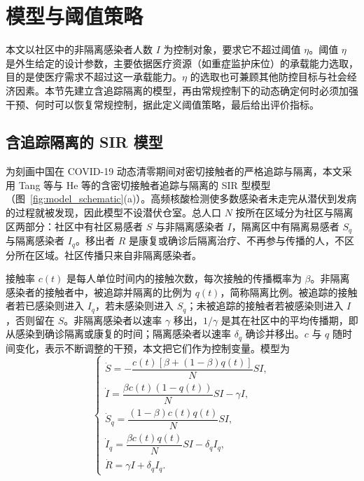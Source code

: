 \section{模型与阈值策略}
\label{sec:model}
本文以社区中的非隔离感染者人数 $I$ 为控制对象，要求它不超过阈值 $\eta$。阈值 $\eta$ 是外生给定的设计参数，主要依据医疗资源（如重症监护床位）的承载能力选取\cite{Miclo2022ICU,Angulo2021}，目的是使医疗需求不超过这一承载能力。$\eta$ 的选取也可兼顾其他防控目标与社会经济因素。本节先建立含追踪隔离的模型，再由常规控制下的动态确定何时必须加强干预、何时可以恢复常规控制，据此定义阈值策略，最后给出评价指标。

\subsection{含追踪隔离的 SIR 模型}
\label{sec:model:equations}
为刻画中国在 COVID-19 动态清零期间对密切接触者的严格追踪与隔离，本文采用 Tang 等\cite{Tang2023Threshold}与 He 等\cite{He2023TDINN}的含密切接触者追踪与隔离的 SIR 型模型（图~\ref{fig:model_schematic}(a)）。高频核酸检测使多数感染者未走完从潜伏到发病的过程就被发现，因此模型不设潜伏仓室。总人口 $N$ 按所在区域分为社区与隔离区两部分：社区中有社区易感者 $S$ 与非隔离感染者 $I$，隔离区中有隔离易感者 $S_q$ 与隔离感染者 $I_q$。移出者 $R$ 是康复或确诊后隔离治疗、不再参与传播的人，不区分所在区域。社区传播只来自非隔离感染者。

接触率 $c(t)$ 是每人单位时间内的接触次数，每次接触的传播概率为 $\beta$。非隔离感染者的接触者中，被追踪并隔离的比例为 $q(t)$，简称隔离比例。被追踪的接触者若已感染则进入 $I_q$，若未感染则进入 $S_q$；未被追踪的接触者若被感染则进入 $I$，否则留在 $S$。非隔离感染者以速率 $\gamma$ 移出，$1/\gamma$ 是其在社区中的平均传播期，即从感染到确诊隔离或康复的时间；隔离感染者以速率 $\delta_q$ 确诊并移出。$c$ 与 $q$ 随时间变化，表示不断调整的干预，本文把它们作为控制变量。模型为
\begin{equation}
\begin{cases}
\dot S=-\dfrac{c(t)[\beta+(1-\beta)q(t)]}{N}SI,\\[.5em]
\dot I=\dfrac{\beta c(t)(1-q(t))}{N}SI-\gamma I,\\[.5em]
\dot S_q=\dfrac{(1-\beta)c(t)q(t)}{N}SI,\\[.5em]
\dot I_q=\dfrac{\beta c(t)q(t)}{N}SI-\delta_q I_q,\\[.5em]
\dot R=\gamma I+\delta_q I_q.
\end{cases}
\label{eq:model:full}
\end{equation}

